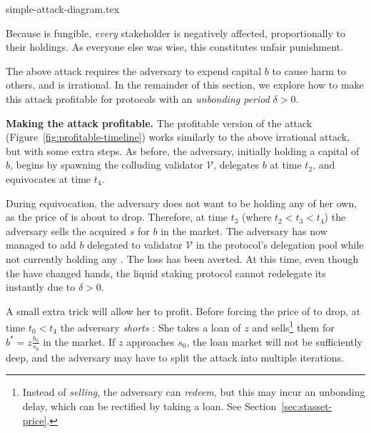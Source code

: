 {simple-attack-diagram.tex}


Because \stasset is fungible, \emph{every} stakeholder is negatively affected,
proportionally to their holdings.
As everyone else was
wise, this constitutes unfair punishment.

The above attack requires the adversary to expend capital $b$ to cause
harm to others, and is irrational. In the remainder of this section, we
explore how to make this attack profitable for protocols with an
\emph{unbonding period} $\delta > 0$.

\noindent
\textbf{Making the attack profitable.}
The profitable version of the attack (Figure~\ref{fig:profitable-timeline}) works similarly to the above
irrational attack, but with some extra steps. As before, the adversary, initially
holding a capital of $b$, begins by spawning the colluding validator $\mathcal{V}$,
delegates $b$ at time $t_2$, and equivocates at time $t_4$.

During equivocation, the adversary does not want to be holding any
\stasset of her own, as the price of \stasset is about to drop.
Therefore, at time $t_3$ (where $t_2 < t_3 < t_4$) the adversary sells
the acquired $s$ \stasset for $b$ \asset in the market.
The adversary has now managed to add $b$ \asset delegated to validator $\mathcal{V}$
in the protocol's delegation pool while not currently holding
any \stasset. The loss has been averted. At this time, even though the
\stassets have changed hands, the liquid staking protocol cannot redelegate
its \assets instantly due to $\delta > 0$.

A small extra trick will allow her to profit.
Before forcing the price of \stasset to drop, at time $t_0 < t_4$
the adversary \emph{shorts}
\stasset: She takes a loan of $z$ \stassets and
sells\footnote{Instead of \emph{selling}, the adversary can \emph{redeem}, but
this may incur an unbonding delay, which can be rectified by taking a loan.
See Section~\ref{sec:stasset-price}.}
them for $b^* = z \frac{b_0}{s_0}$ \asset in the market.
If $z$ approaches $s_0$, the loan market will not be sufficiently deep,
and the adversary may have to split the attack into multiple iterations.

